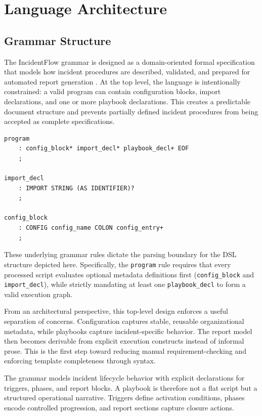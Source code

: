 \chapter*{Language Architecture}
{}

\section{Grammar Structure}

The IncidentFlow grammar is designed as a domain-oriented formal specification that models how incident procedures are described, validated, and prepared for automated report generation \autocite{antlr2013}. At the top level, the language is intentionally constrained: a valid program can contain configuration blocks, import declarations, and one or more playbook declarations. This creates a predictable document structure and prevents partially defined incident procedures from being accepted as complete specifications.

\begin{lstlisting}
program
    : config_block* import_decl* playbook_decl+ EOF
    ;

import_decl
    : IMPORT STRING (AS IDENTIFIER)?
    ;

config_block
    : CONFIG config_name COLON config_entry+
    ;
\end{lstlisting}

These underlying grammar rules dictate the parsing boundary for the DSL structure depicted here. Specifically, the \texttt{program} rule requires that every processed script evaluates optional metadata definitions first (\texttt{config\_block} and \texttt{import\_decl}), while strictly mandating at least one \texttt{playbook\_decl} to form a valid execution graph.

From an architectural perspective, this top-level design enforces a useful separation of concerns. Configuration captures stable, reusable organizational metadata, while playbooks capture incident-specific behavior. The report model then becomes derivable from explicit execution constructs instead of informal prose. This is the first step toward reducing manual requirement-checking and enforcing template completeness through syntax.

The grammar models incident lifecycle behavior with explicit declarations for triggers, phases, and report blocks. A playbook is therefore not a flat script but a structured operational narrative. Triggers define activation conditions, phases encode controlled progression, and report sections capture closure actions.

